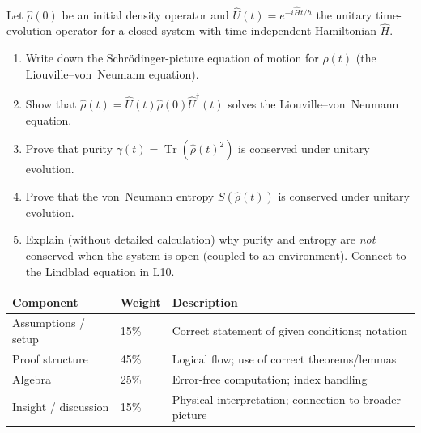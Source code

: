\documentclass[11pt,a4paper]{article}
\begin{document}
\bigskip

\begin{tcolorbox}[ugprobbox, title={Problem 5 --- Time Evolution and Purity Conservation}]
\label{prob:CPSU.5}

Let $\hat{\rho}(0)$ be an initial density operator and
$\hat{U}(t)=e^{-i\hat{H}t/\hbar}$ the unitary time-evolution operator
for a closed system with time-independent Hamiltonian $\hat{H}$.

\begin{enumerate}[label=(\alph*), itemsep=8pt]
  \item Write down the Schr\"odinger-picture equation of motion for $\hat{\rho}(t)$
        (the Liouville--von~Neumann equation).
  \item Show that $\hat{\rho}(t)=\hat{U}(t)\hat{\rho}(0)\hat{U}^\dagger(t)$
        solves the Liouville--von~Neumann equation.
  \item Prove that purity $\gamma(t)=\operatorname{Tr}(\hat{\rho}(t)^2)$ is conserved
        under unitary evolution.
  \item Prove that the von~Neumann entropy $S(\hat{\rho}(t))$ is conserved under
        unitary evolution.
  \item Explain (without detailed calculation) why purity and entropy are
        \emph{not} conserved when the system is open (coupled to an environment).
        Connect to the Lindblad equation in L10.
\end{enumerate}
\end{tcolorbox}

\bigskip
\begin{tcolorbox}[rubricbox, title={CPSU Rubric (per problem, 5 parts each)}]
\begin{tabular}{lll}
\toprule
Component & Weight & Description\\
\midrule
Assumptions / setup   & 15\% & Correct statement of given conditions; notation\\
Proof structure       & 45\% & Logical flow; use of correct theorems/lemmas\\
Algebra               & 25\% & Error-free computation; index handling\\
Insight / discussion  & 15\% & Physical interpretation; connection to broader picture\\
\bottomrule
\end{tabular}
\end{tcolorbox}
\end{document}
